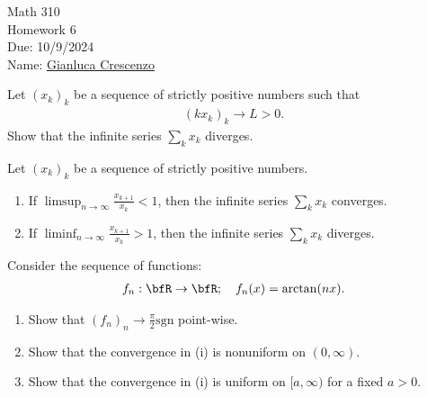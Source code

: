 \documentclass[10pt,twoside,openany]{memoir}
\begin{document}
\begin{center}
    { \Large Math 310 \\[0.1in]Homework 6 \\[0.1in]
    Due: 10/9/2024}\\[.25in]
    { Name:} {\underline{Gianluca Crescenzo\hspace*{2in}}}\\[0.15in]
    \end{center}
    \vspace{4pt}
    \begin{exercise}
        Let $(x_k)_k$ be a sequence of strictly positive numbers such that  
            \begin{equation*}
            \begin{split}
                (kx_k)_k \rightarrow L > 0.
            \end{split}
            \end{equation*}
        Show that the infinite series $\sum_{k}x_k$ diverges.
    \end{exercise}
    \begin{exercise}
        Let $(x_k)_k$ be a sequence of strictly positive numbers.
            \begin{enumerate}[label = (\roman*)]
                \item If $\limsup_{n \rightarrow \infty}\frac{x_{k+1}}{x_k} < 1$, then the infinite series $\sum_k x_k$ converges.
                \item If $\liminf_{n \rightarrow \infty} \frac{x_{k+1}}{x_k} > 1$, then the infinite series $\sum_k x_k$ diverges.
            \end{enumerate}
    \end{exercise}
    \begin{exercise}
        Consider the sequence of functions:
            \begin{equation*}
            \begin{split}
                f_n: \bfR \rightarrow \bfR; \hspace{10pt} f_n(x) = \arctan(nx).
            \end{split}
            \end{equation*}
            \begin{enumerate}[label = (\roman*)]
                \item Show that $(f_n)_n \rightarrow \frac{\pi}{2}\text{sgn}$ point-wise.
                \item Show that the convergence in (i) is nonuniform on $(0,\infty)$.
                \item Show that the convergence in (i) is uniform on $[a,\infty)$ for a fixed $a > 0$.
            \end{enumerate}
    \end{exercise} 
\end{document}
